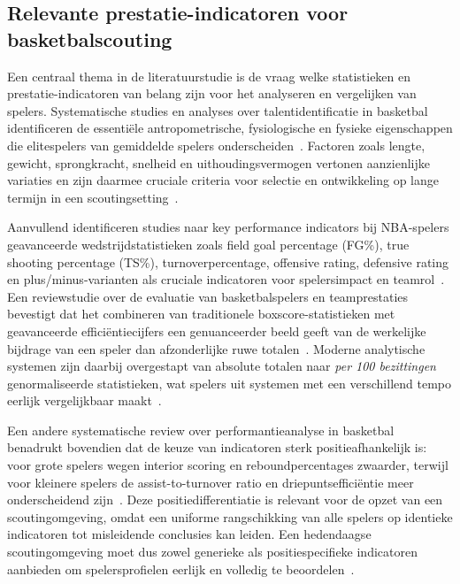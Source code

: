 \subsection{Relevante prestatie-indicatoren voor basketbalscouting}%
\label{subsec:prestatie-indicatoren}

Een centraal thema in de literatuurstudie is de vraag welke statistieken en
prestatie-indicatoren van belang zijn voor het analyseren en vergelijken van spelers.
Systematische studies en analyses over talentidentificatie in basketbal identificeren
de essentiële antropometrische, fysiologische en fysieke eigenschappen die
elitespelers van gemiddelde spelers onderscheiden~\autocite{han2023basketball}.
Factoren zoals lengte, gewicht, sprongkracht, snelheid en uithoudingsvermogen
vertonen aanzienlijke variaties en zijn daarmee cruciale criteria voor selectie en
ontwikkeling op lange termijn in een scoutingsetting~\autocite{han2023basketball}.

Aanvullend identificeren studies naar key performance indicators bij NBA-spelers
geavanceerde wedstrijdstatistieken zoals field goal percentage (FG\%), true shooting
percentage (TS\%), turnoverpercentage, offensive rating, defensive rating en
plus/minus-varianten als cruciale indicatoren voor spelersimpact en
teamrol~\autocite{dehesa2019key}. Een reviewstudie over de evaluatie van
basketbalspelers en teamprestaties bevestigt dat het combineren van traditionele
boxscore-statistieken met geavanceerde efficiëntiecijfers een genuanceerder beeld
geeft van de werkelijke bijdrage van een speler dan afzonderlijke ruwe
totalen~\autocite{sarlis2020sports}. Moderne analytische systemen zijn daarbij
overgestapt van absolute totalen naar \textit{per 100 bezittingen} genormaliseerde
statistieken, wat spelers uit systemen met een verschillend tempo eerlijk
vergelijkbaar maakt~\autocite{nbastuffer}.

Een andere systematische review over performantieanalyse in basketbal benadrukt
bovendien dat de keuze van indicatoren sterk positieafhankelijk is: voor grote
spelers wegen interior scoring en reboundpercentages zwaarder, terwijl voor
kleinere spelers de assist-to-turnover ratio en driepuntsefficiëntie meer
onderscheidend zijn~\autocite{Chen2025}. Deze positiedifferentiatie is relevant
voor de opzet van een scoutingomgeving, omdat een uniforme rangschikking van
alle spelers op identieke indicatoren tot misleidende conclusies kan leiden. Een
hedendaagse scoutingomgeving moet dus zowel generieke als positiespecifieke
indicatoren aanbieden om spelersprofielen eerlijk en volledig te
beoordelen~\autocite{han2023basketball}.

